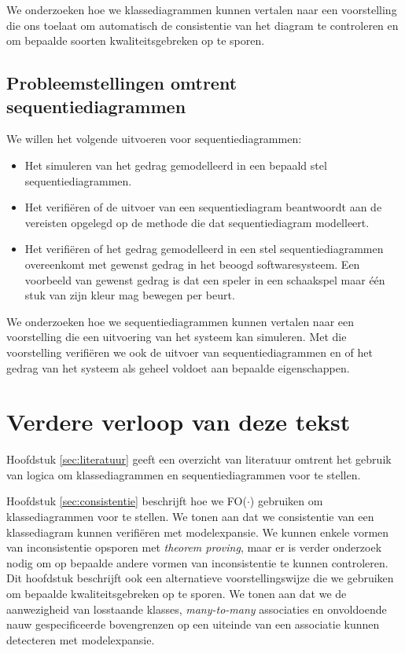 We onderzoeken hoe we klassediagrammen kunnen vertalen naar een voorstelling die ons toelaat om automatisch de consistentie van het diagram te controleren en om bepaalde soorten kwaliteitsgebreken op te sporen.

\subsection{Probleemstellingen omtrent sequentiediagrammen}

We willen het volgende uitvoeren voor sequentiediagrammen:

\begin{itemize}
	\item Het simuleren van het gedrag gemodelleerd in een bepaald stel sequentiediagrammen.
	\item Het verifi\"eren of de uitvoer van een sequentiediagram beantwoordt aan de vereisten opgelegd op de methode die dat sequentiediagram modelleert.
	\item Het verifi\"eren of het gedrag gemodelleerd in een stel sequentiediagrammen overeenkomt met gewenst gedrag in het beoogd softwaresysteem. Een voorbeeld van gewenst gedrag is dat een speler in een schaakspel maar \'e\'en stuk van zijn kleur mag bewegen per beurt.
\end{itemize}

We onderzoeken hoe we sequentiediagrammen kunnen vertalen naar een voorstelling die een uitvoering van het systeem kan simuleren. Met die voorstelling verifi\"eren we ook de uitvoer van sequentiediagrammen en of het gedrag van het systeem als geheel voldoet aan bepaalde eigenschappen.

\section{Verdere verloop van deze tekst}\label{sec:text-structure}

Hoofdstuk \ref{sec:literatuur} geeft een overzicht van literatuur omtrent het gebruik van logica om klassediagrammen en sequentiediagrammen voor te stellen.

Hoofdstuk \ref{sec:consistentie} beschrijft hoe we FO($\cdot$) gebruiken om klassediagrammen voor te stellen. We tonen aan dat we consistentie van een klassediagram kunnen verifi\"eren met modelexpansie. We kunnen enkele vormen van inconsistentie opsporen met \textit{theorem proving}, maar er is verder onderzoek nodig om op bepaalde andere vormen van inconsistentie te kunnen controleren. Dit hoofdstuk beschrijft ook een alternatieve voorstellingswijze die we gebruiken om bepaalde kwaliteitsgebreken op te sporen. We tonen aan dat we de aanwezigheid van losstaande klasses, \textit{many-to-many} associaties en onvoldoende nauw gespecificeerde bovengrenzen op een uiteinde van een associatie kunnen detecteren met modelexpansie.

